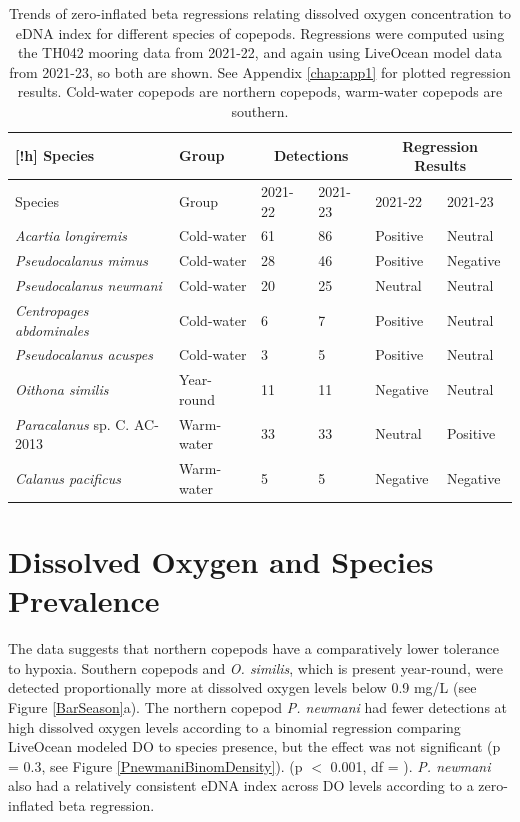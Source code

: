 \documentclass[12pt,twoside]{reedthesis}
\begin{document}
	\begin{table}[!h] 
		
		\caption[Zero-inflated beta regression results]{Trends of zero-inflated beta regressions relating dissolved oxygen concentration to eDNA index for different species of copepods. Regressions were computed using the TH042 mooring data from 2021-22, and again using LiveOcean model data from 2021-23, so both are shown. See Appendix \ref{chap:app1} for plotted regression results. Cold-water copepods are northern copepods, warm-water copepods are southern.}  
		
		\begin{center} 
			\begin{tabular}{l | l | l l | l l} [!h]
				\toprule
				Species & Group & \multicolumn{2}{|c|}{Detections} & \multicolumn{2}{|c}{Regression Results} \tabularnewline
				\midrule
				Species &  Group & 2021-22 & 2021-23 & 2021-22 & 2021-23  \\ 
				\midrule 
				\textit{Acartia longiremis}	& Cold-water & 61 & 86 & Positive & Neutral  \\
				\textit{Pseudocalanus mimus} & Cold-water & 28  & 46 & Positive & Negative  \\
				\textit{Pseudocalanus newmani}	& Cold-water & 20  & 25 & Neutral & Neutral \\
				\textit{Centropages abdominales} & Cold-water & 6 & 7 & Positive & Neutral   \\
				\textit{Pseudocalanus acuspes}  & Cold-water & 3  & 5 & Positive & Neutral  \\
				\textit{Oithona similis} & Year-round & 11  & 11 & Negative & Neutral \\
				\textit{Paracalanus} sp. C. AC-2013 & Warm-water & 33  & 33 & Neutral & Positive  \\
				\textit{Calanus pacificus}	& Warm-water & 5  & 5 & Negative & Negative  \\
				\bottomrule 
			\end{tabular}
			\label{ZOIBtab}
		\end{center}
	\end{table}
	
	\section{Dissolved Oxygen and Species Prevalence} 
	
	The data suggests that northern copepods have a comparatively lower tolerance to hypoxia. Southern copepods and \textit{O. similis}, which is present year-round, were detected proportionally more at dissolved oxygen levels below 0.9 mg/L (see Figure \ref{BarSeason}a). The northern copepod \textit{P. newmani} had fewer detections at high dissolved oxygen levels according to a binomial regression comparing LiveOcean modeled DO to species presence, but the effect was not significant (p = 0.3, see Figure \ref{PnewmaniBinomDensity}).  (p ${<}$ 0.001, df = ). \textit{P. newmani} also had a relatively consistent eDNA index across DO levels according to a zero-inflated beta regression. 
	
\end{document}
